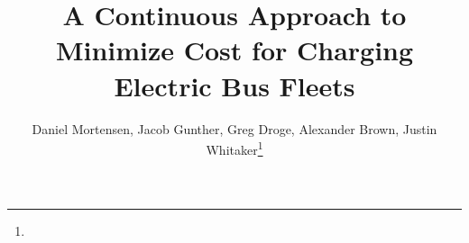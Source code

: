 \documentclass[lettersize,journal]{IEEEtran}
\begin{document}
\title{A Continuous Approach to Minimize Cost for Charging Electric Bus Fleets}
\author{Daniel Mortensen, Jacob Gunther, Greg Droge, Alexander Brown, Justin Whitaker\thanks{}}

%
{}

\maketitle 









\printbibliography
\end{document}
